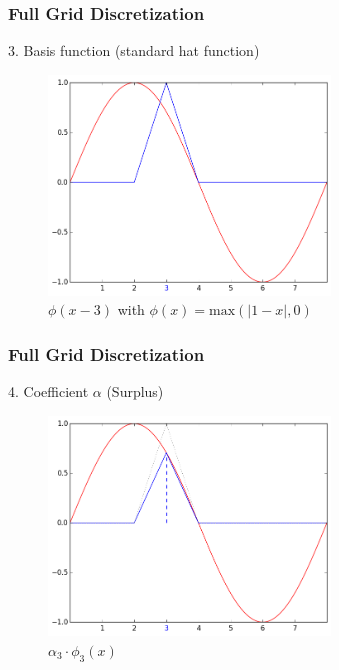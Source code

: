 \begin{frame}
  \frametitle{Full Grid Discretization}
  \topline
  \vspace{-10px}
  \begin{block}{3. Basis function (standard hat function)}
    \begin{figure}[!htp]

      \centering
      \includegraphics[width=7.5cm]{images/singlebasis_3}
      \vspace{-12px}
      \caption{$\phi(x - 3)$ with $\phi(x) = \text{max}(|1 - x|, 0)$}
    \end{figure}
  \end{block}
\end{frame}

\begin{frame}
  \frametitle{Full Grid Discretization}
  \topline
  \vspace{-10px}
  \begin{block}{4. Coefficient $\alpha$ (Surplus)}
    \begin{figure}[!htp]

      \centering
      \includegraphics[width=7.5cm]{images/singlebasis_4}
      \vspace{-12px}
      \caption{$\alpha_3 \cdot \phi_3(x)$}
    \end{figure}
  \end{block}
\end{frame}

